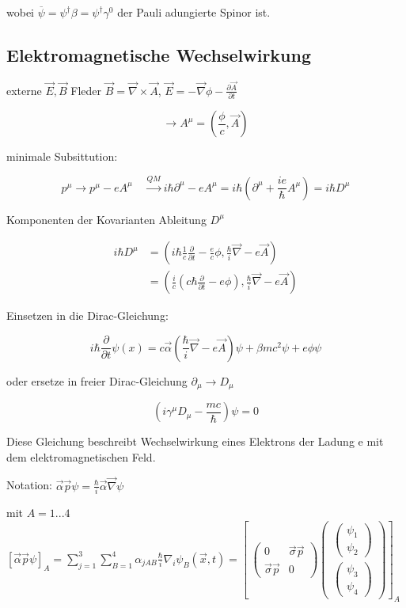 wobei \(\overline \psi = \psi^\dagger\beta=\psi^\dagger\gamma^0\) der Pauli adungierte Spinor ist.


\subsection{Elektromagnetische Wechselwirkung}

externe \(\vec E,\vec B\) Fleder \(\vec B = \vec\nabla\times\vec A\), \(\vec E = -\vec\nabla\phi-\frac{\partial\vec A}{\partial t}\)

\[\rightarrow A^\mu = (\frac{\phi}{c},\vec A)\]

minimale Subsittution:

\[p^\mu\rightarrow p^\mu-eA^\mu \quad \xrightarrow{QM} i\hbar\partial^\mu-eA^\mu = i\hbar(\partial^\mu+\frac{ie}{\hbar}A^\mu)=i\hbar D^\mu\]

Komponenten der Kovarianten Ableitung \(D^\mu\)

\begin{align}
i\hbar D^\mu &= (i\hbar \frac{1}{c} \frac{\partial}{\partial t} - \frac{e}{c}\phi,\frac{\hbar}{i}\vec\nabla-e\vec A)\\&=(\frac{i}{c}(c\hbar\frac{\partial}{\partial t}-e\phi),\frac{\hbar}{i}\vec\nabla-e\vec A) 
\end{align}

Einsetzen in die Dirac-Gleichung:

\begin{equation}
\boxed{i\hbar \frac{\partial}{\partial t}\psi(x) = c\vec \alpha(\frac{\hbar}{i}\vec\nabla-e\vec A)\psi+\beta m c^2\psi+e\phi\psi}
\label{eq:dirac-elm1}
\end{equation}

oder ersetze in freier Dirac-Gleichung \( \partial_\mu\rightarrow D_\mu \)  

\begin{equation}
\boxed{(i\gamma^\mu D_\mu - \frac{mc}{\hbar})\psi = 0}
\label{eq:dirac-elm2}
\end{equation}

Diese Gleichung beschreibt Wechselwirkung eines Elektrons der Ladung e mit dem elektromagnetischen Feld.

Notation: \(\vec \alpha\vec p\psi = \frac{\hbar}{i}\vec\alpha\vec\nabla\psi\)

mit \(A=1...4\) \([\vec\alpha\vec p\psi]_A=\sum_{j=1}^3\sum_{B=1}^4\alpha_{jAB}\frac{\hbar}{i}\nabla_i\psi_B(\vec x,t) = \left[\ \begin{pmatrix} 0&\vec\sigma\vec p\\ \vec\sigma\vec p&0\end{pmatrix}\begin{pmatrix} \begin{pmatrix} \psi_1\\\psi_2\end{pmatrix} \\ \begin{pmatrix} \psi_3\\\psi_4\end{pmatrix}  \end{pmatrix} \right]_A\)


